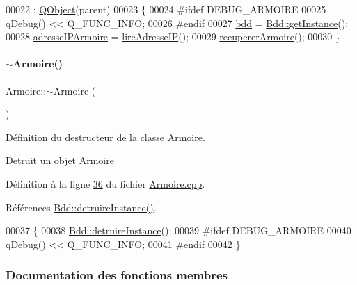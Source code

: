 \begin{DoxyCode}
00022                                 : \hyperlink{class_q_object}{QObject}(parent)
00023 \{
00024 \textcolor{preprocessor}{    #ifdef DEBUG\_ARMOIRE}
00025         qDebug() << Q\_FUNC\_INFO;
00026 \textcolor{preprocessor}{    #endif}
00027     \hyperlink{class_armoire_a555f656018e7b600987128cdc792e320}{bdd} = \hyperlink{class_bdd_a6f55c29d593da12ca31fad02f5adfe24}{Bdd::getInstance}();
00028     \hyperlink{class_armoire_ab96bd042aa78eaefba0aefb860684ca6}{adresseIPArmoire} = \hyperlink{class_armoire_abc30649cc7d4f3c0cefcc54894aeb406}{lireAdresseIP}();
00029     \hyperlink{class_armoire_a1c5266f9e4b01c0d2e1d244d2f11fffd}{recupererArmoire}();
00030 \}
\end{DoxyCode}
\mbox{\label{class_armoire_a0f506a879391a987f12f59a23f60634e}} 
\paragraph{\texorpdfstring{$\sim$\+Armoire()}{~Armoire()}}
{\footnotesize\ttfamily Armoire\+::$\sim$\+Armoire (\begin{DoxyParamCaption}{ }\end{DoxyParamCaption})}



Définition du destructeur de la classe \hyperlink{class_armoire}{Armoire}. 

Detruit un objet \hyperlink{class_armoire}{Armoire} 

Définition à la ligne \hyperlink{_armoire_8cpp_source_l00036}{36} du fichier \hyperlink{_armoire_8cpp_source}{Armoire.\+cpp}.



Références \hyperlink{_bdd_8cpp_source_l00073}{Bdd\+::detruire\+Instance()}.


\begin{DoxyCode}
00037 \{
00038     \hyperlink{class_bdd_af89fa3ffa107c7859a3964bf032cfdb7}{Bdd::detruireInstance}();
00039 \textcolor{preprocessor}{    #ifdef DEBUG\_ARMOIRE}
00040         qDebug() << Q\_FUNC\_INFO;
00041 \textcolor{preprocessor}{    #endif}
00042 \}
\end{DoxyCode}


\subsubsection{Documentation des fonctions membres}
\mbox{\label{class_armoire_a706def736570580d7e5e3d2e29321c66}} 
